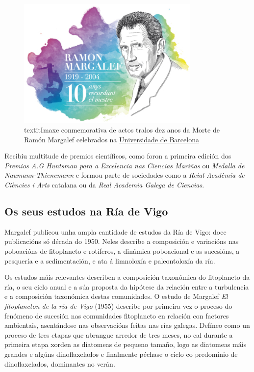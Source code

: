 \documentclass{article}
\begin{document}
\begin{figure}[htp]
    \centering
    \includegraphics[width=0.8\textwidth]{./figure/logomargalef.png}
    \caption*{textit{Imaxe conmemorativa de actos tralos dez anos da Morte de Ramón Margalef celebrados na \href{www.ub.edu}{Universidade de Barcelona}}}
    \label{fig:icm_memoriam}
\end{figure}

Recibiu multitude de premios científicos, como foron a primeira edición dos \textit{Premios A.G Huntsman para a Excelencia nas Ciencias Mariñas} ou \textit{Medalla de Naumann-Thienemann} e formou parte de sociedades como a \textit{Reial Acadèmia de Ciències i Arts} catalana ou da \textit{Real Academia Galega de Ciencias}.

\subsection{Os seus estudos na Ría de Vigo}
Margalef publicou unha ampla cantidade de estudos da Ría de Vigo: doce publicacións só  década do 1950. Neles describe a composición e variacións nas poboacións de fitoplancto e rotíferos, a dinámica poboacional e as sucesións, a pesquería e a sedimentación, e ata á limnoloxía e paleontoloxía da ría. 

Os estudos máis relevantes describen a composición taxonómica do fitoplancto da ría, o seu ciclo anual e a súa proposta da hipótese da relación entre a turbulencia e a composición taxonómica destas comunidades. O estudo de Margalef \textit{El fitoplancton de la ría de Vigo} (1955) describe por primeira vez o proceso do fenómeno de sucesión nas comunidades fitoplancto en relación con factores ambientais, asentándose nas observacións feitas nas rías galegas. Defíneo como un proceso de tres etapas que abrangue arredor de tres meses, no cal durante a primeira etapa xorden as diatomeas de pequeno tamaño, logo as diatomeas máis grandes e algúns dinoflaxelados e finalmente péchase o ciclo co predominio de dinoflaxelados, dominantes no verán.
\end{document}
